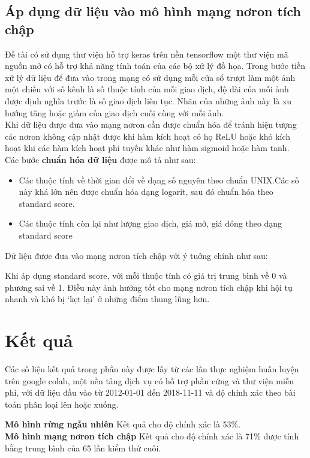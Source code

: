  \subsection{Áp dụng dữ liệu vào mô hình mạng nơron tích chập}
 Đề tài có sử dụng thư viện hỗ trợ keras trên nền tensorflow một thư viện mã nguồn mở có hỗ trợ khả năng tính toán của các bộ xử lý đồ họa. Trong bước tiền xử lý dữ liệu để đưa vào trong mạng có sử dụng mỗi cửa sổ trượt làm một ảnh một chiều với số kênh là số thuộc tính của mỗi giao dịch, độ dài của mỗi ảnh được định nghĩa trước là số giao dịch liên tục. Nhãn của những ảnh này là xu hướng tăng hoặc giảm của giao dịch cuối cùng với mỗi ảnh.\\
 Khi dữ liệu được đưa vào mạng nơron cần được chuẩn hóa để tránh hiện tượng các nơron không cập nhật được khi hàm kích hoạt có họ ReLU hoặc khó kích hoạt khi các hàm kích hoạt phi tuyến khác như hàm sigmoid hoặc hàm tanh.\\ Các bước \textbf{chuẩn hóa dữ liệu} được mô tả như sau:
 \begin{itemize}
 	\item Các thuộc tính về thời gian đổi về dạng số nguyên theo chuẩn UNIX.Các số này khá lớn nên được chuẩn hóa dạng logarit, sau đó chuẩn hóa theo standard score.
 	\item Các thuộc tính còn lại như lượng giao dịch, giá mở, giá đóng theo dạng standard score
 \end{itemize}

Dữ liệu được đưa vào mạng nơron tích chập với ý tuởng chính như sau:



Khi áp dụng standard score, với mỗi thuộc tính có giá trị trung bình về 0 và phương sai về 1. Điều này ảnh hưởng tốt cho mạng nơron tích chập khi hội tụ nhanh và khó bị `kẹt lại' ở những điểm thung lũng hơn.

 
 \section{Kết quả}
 Các số liệu kết quả trong phần này được lấy từ các lần thực nghiệm huấn luyện trên google colab, một nền tảng dịch vụ có hỗ trợ phần cứng và thư viện miễn phí, với dữ liệu đầu vào từ  2012-01-01 đến 2018-11-11 và độ chính xác theo bài toán phân loại lên hoặc xuống.
 
  \textbf{Mô hình rừng ngẫu nhiên} Kết quả cho độ chính xác là 53\%. \\
  \textbf{Mô hình mạng nơron tích chập} Kết quả cho độ chính xác là 71\% được tính bằng trung bình của 65 lần kiểm thử cuối. %
 
 